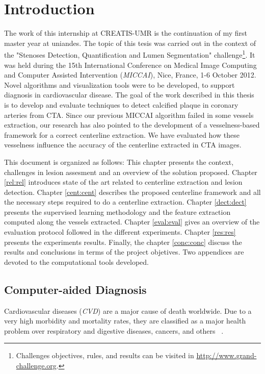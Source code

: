 \chapter{Introduction}\label{intr:intr}

The work of this internship at CREATIS-UMR is the continuation of my first master year at uniandes. The topic of this tesis was carried out in the context of the "Stenoses Detection, Quantification and Lumen Segmentation" challenge\footnote{Challenges objectives, rules, and results can be visited in \href{http://www.grand-challenge.org}{http://www.grand-challenge.org}.}. It was held during the 15th International Conference on Medical Image Computing and Computer Assisted Intervention (\textit{MICCAI}), Nice, France, 1-6 October 2012.  Novel algorithms and visualization tools were to be developed, to support diagnosis in cardiovascular disease. The goal of the work described in this thesis is to develop and evaluate techniques to detect calcified plaque in coronary arteries from CTA. Since our previous MICCAI algorithm failed in some vessels extraction, our research has also pointed to the development of a vesselness-based framework for a correct centerline extraction. We have evaluated how these vesselness influence the accuracy of the centerline extracted in CTA images.

This document is organized as follows: This chapter presents the context, challenges in lesion assesment and an overview of the solution proposed. Chapter \ref{rel:rel} introduces state of the art related to centerline extraction and lesion detection. Chapter \ref{cent:cent} describes the proposed centerline framework and all the necessary steps required to do a centerline extraction. Chapter \ref{dect:dect} presents the supervised learning methodology and the feature extraction computed along the vessels extracted. Chapter \ref{eval:eval} gives an overview of the evaluation protocol followed in the different experiments. Chapter \ref{res:res} presents the experiments results. Finally, the chapter \ref{conc:conc} discuss the results and conclusions in terms of the project objetives. Two appendices are devoted to the computational tools developed.

\section{Computer-aided Diagnosis}
Cardiovascular diseases (\textit{CVD}) are a major cause of death worldwide. Due to a very high morbidity and mortality rates, they are classified as a major health problem over respiratory and digestive diseases, cancers, and others  ~\citep{WHO2011}.

